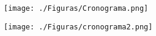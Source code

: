 \begin{figure}[htb]
	\begin{center}
		\texttt{[image: ./Figuras/Cronograma.png]}
	\end{center}
	\vspace{-1em} %
	\label{fig:crono1}
\end{figure}

\newpage
\begin{figure}[htb]
	\begin{center}
		\texttt{[image: ./Figuras/cronograma2.png]}
	\end{center}
	\vspace{-1em} %
	\label{fig:crono2}
\end{figure}